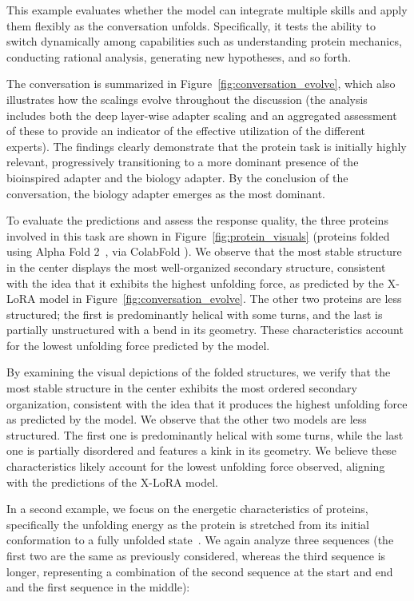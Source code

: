 This example evaluates whether the model can integrate multiple skills and apply them flexibly as the conversation unfolds. Specifically, it tests the ability to switch dynamically among capabilities such as understanding protein mechanics, conducting rational analysis, generating new hypotheses, and so forth.

The conversation is summarized in Figure~\ref{fig:conversation_evolve}, which also illustrates how the scalings evolve throughout the discussion (the analysis includes both the deep layer-wise adapter scaling and an aggregated assessment of these to provide an indicator of the effective utilization of the different experts). The findings clearly demonstrate that the protein task is initially highly relevant, progressively transitioning to a more dominant presence of the bioinspired adapter and the biology adapter. By the conclusion of the conversation, the biology adapter emerges as the most dominant.

To evaluate the predictions and assess the response quality, the three proteins involved in this task are shown in Figure~\ref{fig:protein_visuals} (proteins folded using Alpha Fold 2~\cite{Jumper2021HighlyAlphaFoldb}, via ColabFold \cite{Mirdita2022ColabFold:All}). We observe that the most stable structure in the center displays the most well-organized secondary structure, consistent with the idea that it exhibits the highest unfolding force, as predicted by the X-LoRA model in Figure~\ref{fig:conversation_evolve}. The other two proteins are less structured; the first is predominantly helical with some turns, and the last is partially unstructured with a bend in its geometry. These characteristics account for the lowest unfolding force predicted by the model.

By examining the visual depictions of the folded structures, we verify that the most stable structure in the center exhibits the most ordered secondary organization, consistent with the idea that it produces the highest unfolding force as predicted by the model. We observe that the other two models are less structured. The first one is predominantly helical with some turns, while the last one is partially disordered and features a kink in its geometry. We believe these characteristics likely account for the lowest unfolding force observed, aligning with the predictions of the X-LoRA model.

In a second example, we focus on the energetic characteristics of proteins, specifically the unfolding energy as the protein is stretched from its initial conformation to a fully unfolded state~\cite{Ni2023ForceGen:Model}. We again analyze three sequences (the first two are the same as previously considered, whereas the third sequence is longer, representing a combination of the second sequence at the start and end and the first sequence in the middle):

